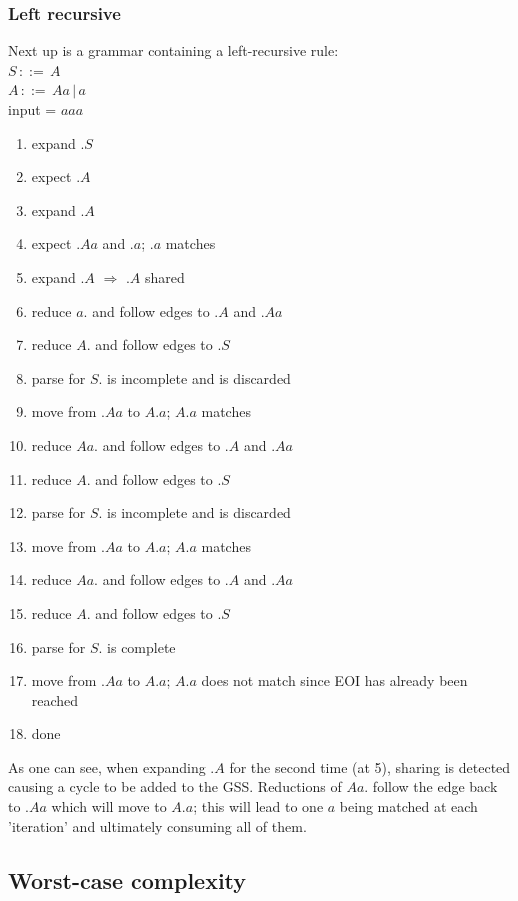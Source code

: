 \documentclass[a4paper,10pt]{article}
\begin{document}
\subsubsection{Left recursive}
\label{sec:tracesLeftRecusive}
Next up is a grammar containing a left-recursive rule:\\
$S\,::=\,A$\\
$A\,::=\,Aa\,|\,a$\\
input = $aaa$

\begin{enumerate}
 \setlength{\itemsep}{0pt}
 \setlength{\parskip}{0pt}
 \setlength{\parsep}{0pt}
 
 \item expand $.S$
 \item expect $.A$
 \item expand $.A$
 \item expect $.Aa$ and $.a$; $.a$ matches
 \item expand $.A$ $\Rightarrow$ $.A$ shared
 \item reduce $a.$ and follow edges to $.A$ and $.Aa$
 \item reduce $A.$ and follow edges to $.S$
 \item parse for $S.$ is incomplete and is discarded
 \item move from $.Aa$ to $A.a$; $A.a$ matches
 \item reduce $Aa.$ and follow edges to $.A$ and $.Aa$
 \item reduce $A.$ and follow edges to $.S$
 \item parse for $S.$ is incomplete and is discarded
 \item move from $.Aa$ to $A.a$; $A.a$ matches
 \item reduce $Aa.$ and follow edges to $.A$ and $.Aa$
 \item reduce $A.$ and follow edges to $.S$
 \item parse for $S.$ is complete
 \item move from $.Aa$ to $A.a$; $A.a$ does not match since EOI has already been reached
 \item done
\end{enumerate}
As one can see, when expanding $.A$ for the second time (at 5), sharing is detected causing a cycle to be added to the GSS. Reductions of $Aa.$ follow the edge back to $.Aa$ which will move to $A.a$; this will lead to one $a$ being matched at each 'iteration' and ultimately consuming all of them.

\subsection{Worst-case complexity}
\end{document}
